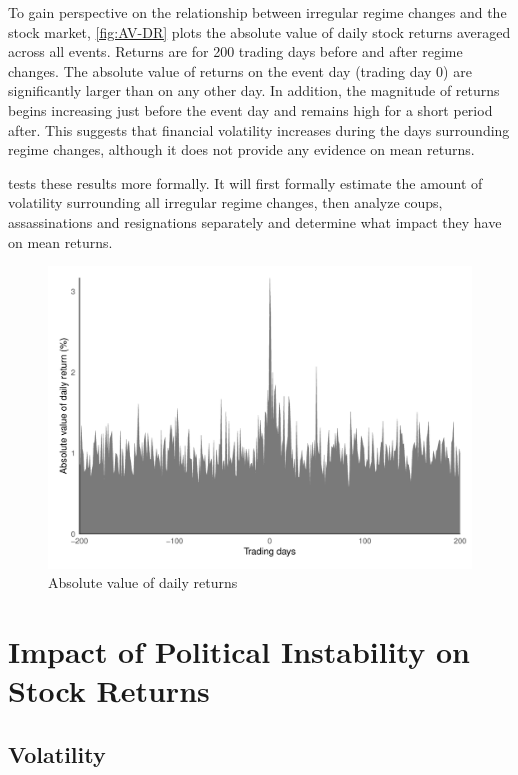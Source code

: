 \documentclass[12pt,final,fleqn]{article}
\theoremstyle{plain}
\begin{document}
To gain perspective on the relationship between irregular regime changes and the stock market, \autoref{fig:AV-DR} plots the absolute value of daily stock returns averaged across all events. Returns are for 200 trading days before and after regime changes. The absolute value of returns on the event day (trading day 0) are significantly larger than on any other day. In addition, the magnitude of returns begins increasing just before the event day and remains high for a short period after. This suggests that financial volatility increases during the days surrounding regime changes, although it does not provide any evidence on mean returns.

 tests these results more formally. It will first formally estimate the amount of volatility surrounding all irregular regime changes, then analyze coups, assassinations and resignations separately and determine what impact they have on mean returns.

\begin{figure}[!ht]
\includegraphics{../figs/daily_mean_absreturn.pdf}
\caption{Absolute value of daily returns}
\label{fig:AV-DR}
\end{figure}


\section{Impact of Political Instability on Stock Returns} \label{sec: Impact of Political Instability on Stock Returns}

\subsection{Volatility} \label{subsec: Volatility}
\end{document}
